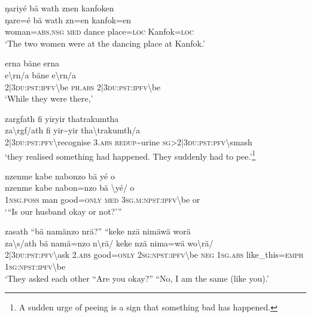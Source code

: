 \ea\label{ex:8:a1804}
ŋariyé bä wath znen kanfoken\\
\gll ŋare=é	bä	wath	zn=en	kanfok=en\\
     woman=\textsc{abs}.\textsc{nsg}	\textsc{med}	dance	place=\textsc{loc}	Kanfok=\textsc{loc}\\
\glt `The two women were at the dancing place at Kanfok.'
\z

\ea\label{ex:8:a1805}
erna bäne erna\\
\gll e{\textbackslash}rn/a	bäne	e{\textbackslash}rn/a\\
     2|3\textsc{du}:\textsc{pst}:\textsc{ipfv}{\textbackslash}be	\textsc{ph}.\textsc{abs}	2|3\textsc{du}:\textsc{pst}:\textsc{ipfv}{\textbackslash}be\\
\glt `While they were there,'
\z

\ea\label{ex:8:a1806}
zargfath fi yiryir thatrakumtha\\
\gll za{\textbackslash}rgf/ath	fi	yir{\textasciitilde}yir	tha{\textbackslash}trakumth/a\\
     2|3\textsc{du}:\textsc{pst}:\textsc{pfv}{\textbackslash}recognise	3.\textsc{abs}	\textsc{redup}{\textasciitilde}urine	\textsc{sg}>2|3\textsc{du}:\textsc{pst}:\textsc{pfv}{\textbackslash}smash\\
\glt `they realised something had happened. They suddenly had to pee.'\footnote{A sudden urge of peeing is a sign that something bad has happened.}
\z

\ea\label{ex:8:a1808}
nzenme kabe nabonzo bä yé o\\
\gll nzenme	kabe	nabon=nzo	bä	{\textbackslash}yé/	o\\
     1\textsc{nsg}.\textsc{poss}	man	good=\textsc{only}	\textsc{med}	3\textsc{sg}.\textsc{m}:\textsc{npst}:\textsc{ipfv}{\textbackslash}be	or\\
\glt `{``}Is our husband okay or not?'''
\z

\ea\label{ex:8:a1810}
zasath ``bä namänzo nrä?'' ``keke nzä nimäwä worä\\
\gll za{\textbackslash}s/ath	bä	namä=nzo	n{\textbackslash}rä/	keke	nzä	nima=wä	wo{\textbackslash}rä/\\
     2|3\textsc{du}:\textsc{pst}:\textsc{pfv}{\textbackslash}ask	2.\textsc{abs}	good=\textsc{only}	2\textsc{sg}:\textsc{npst}:\textsc{ipfv}{\textbackslash}be	\textsc{neg}	1\textsc{sg}.\textsc{abs}	like\_this=\textsc{emph}	1\textsc{sg}:\textsc{npst}:\textsc{ipfv}{\textbackslash}be\\
\glt `They asked each other ``Are you okay?'' ``No, I am the same (like you).'
\z

